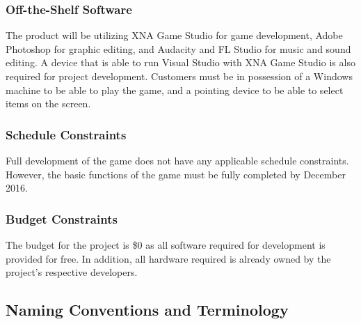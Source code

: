 \documentclass{article}
\begin{document}
\subsubsection{Off-the-Shelf Software}
The product will be utilizing XNA Game Studio for game development, Adobe Photoshop for graphic editing, and Audacity and FL Studio for music and sound editing. A device that is able to run Visual Studio with XNA Game Studio is also required for project development. Customers must be in possession of a Windows machine to be able to play the game, and a pointing device to be able to select items on the screen.

\subsubsection{Schedule Constraints}
Full development of the game does not have any applicable schedule constraints. However, the basic functions of the game must be fully completed by December 2016.

\subsubsection{Budget Constraints}
The budget for the project is \$0 as all software required for development is provided for free. In addition, all hardware required is already owned by the project's respective developers.

\subsection{Naming Conventions and Terminology}
\end{document}
